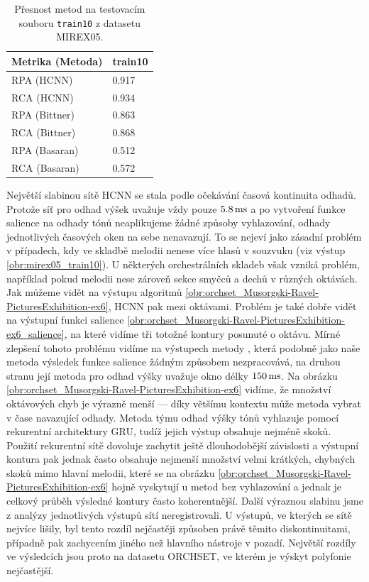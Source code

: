 \begin{table}[h]
\centering

    \begin{tabular}{ll}
    \toprule
    Metrika (Metoda) & train10 \\
    \midrule
          RPA (HCNN) &   0.917 \\
          RCA (HCNN) &   0.934 \\
      RPA (Bittner) &   0.863 \\
      RCA (Bittner) &   0.868 \\
      RPA (Basaran) &   0.512 \\
      RCA (Basaran) &   0.572 \\
    \bottomrule
    \end{tabular}

\caption{Přesnost metod na testovacím souboru \texttt{train10} z datasetu MIREX05.}\label{tab:mirex05_train10}
\end{table}

Největší slabinou sítě HCNN se stala podle očekávání časová kontinuita odhadů. Protože síť pro odhad výšek uvažuje vždy pouze $5.8\,\rm ms$ a po vytvoření funkce salience na odhady tónů neaplikujeme žádné způsoby vyhlazování, odhady jednotlivých časových oken na sebe nenavazují. To se nejeví jako zásadní problém v případech, kdy ve skladbě melodii nenese více hlasů v souzvuku (viz výstup \ref{obr:mirex05_train10}). U některých orchestrálních skladeb však vzniká problém, například pokud melodii nese zároveň sekce smyčců a dechů v různých oktávách. Jak můžeme vidět na výstupu algoritmů \ref{obr:orchset_Musorgski-Ravel-PicturesExhibition-ex6}, HCNN pak  mezi oktávami. Problém je také dobře vidět na výstupní funkci salience \ref{obr:orchset_Musorgski-Ravel-PicturesExhibition-ex6_salience}, na které vidíme tři totožné kontury posunuté o oktávu. Mírné zlepšení tohoto problému vidíme na výstupech metody \cite{Bittner2017}, která podobně jako naše metoda výsledek funkce salience žádným způsobem nezpracovává, na druhou stranu její metoda pro odhad výšky uvažuje okno délky $150\,\rm ms$. Na obrázku \ref{obr:orchset_Musorgski-Ravel-PicturesExhibition-ex6} vidíme, že množství oktávových chyb je výrazně menší --- díky většímu kontextu může metoda vybrat v čase navazující odhady. Metoda týmu \cite{DBasaranSEssid2018} odhad výšky tónů vyhlazuje pomocí rekurentní architektury GRU, tudíž jejich výstup obsahuje nejméně skoků. Použití rekurentní sítě dovoluje zachytit ještě dlouhodobější závislosti a výstupní kontura pak jednak často obsahuje nejmenší množství velmi krátkých, chybných skoků mimo hlavní melodii, které se na obrázku \ref{obr:orchset_Musorgski-Ravel-PicturesExhibition-ex6} hojně vyskytují u metod bez vyhlazování a jednak je celkový průběh výsledné kontury často koherentnější. Další výraznou slabinu jsme z analýzy jednotlivých výstupů sítí neregistrovali. U výstupů, ve kterých se sítě nejvíce lišily, byl tento rozdíl nejčastěji způsoben právě těmito diskontinuitami, případně pak zachycením jiného než hlavního nástroje v pozadí. Největší rozdíly ve výsledcích jsou proto na datasetu ORCHSET, ve kterém je výskyt polyfonie nejčastější. 

